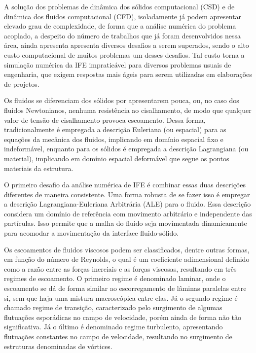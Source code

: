 A solução dos problemas de dinâmica dos sólidos computacional (CSD) e de dinâmica dos fluidos computacional (CFD), isoladamente já podem apresentar elevado grau de complexidade, de forma que a análise numérica do problema acoplado, a despeito do número de trabalhos que já foram desenvolvidos nessa área, ainda apresenta apresenta diversos desafios a serem superados, sendo o alto custo computacional de muitos problemas um desses desafios. Tal custo torna a simulação numérica da IFE impraticável para diversos problemas usuais de engenharia, que exigem respostas mais ágeis para serem utilizadas em elaborações de projetos.

Os fluidos se diferenciam dos sólidos por apresentarem pouca, ou, no caso dos fluidos Newtonianos, nenhuma resistência ao cisalhamento, de modo que qualquer valor de tensão de cisalhamento provoca escoamento. Dessa forma, tradicionalmente é empregada a descrição Euleriana (ou espacial) para as equações da mecânica dos fluidos, implicando em domínio espacial fixo e indeformável, enquanto para os sólidos é empregada a descrição Lagrangiana (ou material), implicando em domínio espacial deformável que segue os pontos materiais da estrutura.

O primeiro desafio da análise numérica de IFE é combinar essas duas descrições diferentes de maneira consistente. Uma forma robusta de se fazer isso é empregar a descrição Lagrangiana-Euleriana Arbitrária (ALE) \cite{donea1982arbitrary} para o fluido. Essa descrição considera um domínio de referência com movimento arbitrário e independente das partículas. Isso permite que a malha do fluido seja movimentada dinamicamente para acomodar a movimentação da interface fluido-sólido.

Os escoamentos de fluidos viscosos podem ser classificados, dentre outras formas, em função do número de Reynolds, o qual é um coeficiente adimensional definido como a razão entre as forças inerciais e as forças viscosas, resultando em três regimes de escoamento. O primeiro regime é denominado laminar, onde o escoamento se dá de forma similar ao escorregamento de lâminas paralelas entre si, sem que haja uma mistura macroscópica entre elas. Já o segundo regime é chamado regime de transição, caracterizado pelo surgimento de algumas flutuações esporádicas no campo de velocidade, porém ainda de forma não tão significativa. Já o último é denominado regime turbulento, apresentando flutuações constantes no campo de velocidade, resultando no surgimento de estruturas denominadas de vórtices.

